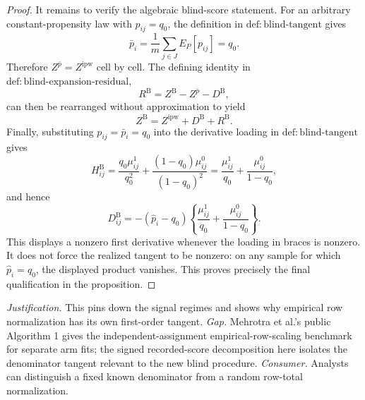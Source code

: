 \documentclass{article}
\begin{document}
\begin{proof}
It remains to verify the algebraic blind-score statement.  For an arbitrary constant-propensity law with \(p_{ij}=q_0\), the definition in \(\mathrm{def:blind\mbox{-}tangent}\) gives
\[
 \bar p_i=\frac1m\sum_{j\in J}E_P[p_{ij}]=q_0.
\]
Therefore \(Z^{\bar p}=Z^{\mathrm{ipw}}\) cell by cell.  The defining identity in \(\mathrm{def:blind\mbox{-}expansion\mbox{-}residual}\),
\[
 R^{\mathrm B}=Z^{\mathrm B}-Z^{\bar p}-D^{\mathrm B},
\]
can then be rearranged without approximation to yield
\[
 Z^{\mathrm B}=Z^{\mathrm{ipw}}+D^{\mathrm B}+R^{\mathrm B}.
\]
Finally, substituting \(p_{ij}=\bar p_i=q_0\) into the derivative loading in \(\mathrm{def:blind\mbox{-}tangent}\) gives
\[
 H^{\mathrm B}_{ij}
 =\frac{q_0\mu^1_{ij}}{q_0^2}
  +\frac{(1-q_0)\mu^0_{ij}}{(1-q_0)^2}
 =\frac{\mu^1_{ij}}{q_0}+\frac{\mu^0_{ij}}{1-q_0},
\]
and hence
\[
 D^{\mathrm B}_{ij}
 =-(\widehat p_i-q_0)
 \left\{\frac{\mu^1_{ij}}{q_0}+\frac{\mu^0_{ij}}{1-q_0}\right\}.
\]
This displays a nonzero first derivative whenever the loading in braces is nonzero.  It does not force the realized tangent to be nonzero: on any sample for which \(\widehat p_i=q_0\), the displayed product vanishes.  This proves precisely the final qualification in the proposition.
\end{proof}
\par\smallskip\noindent \textit{Justification.} This pins down the signal regimes and shows why empirical row normalization has its own first-order tangent. \textit{Gap.} Mehrotra et al.'s public Algorithm 1 gives the independent-assignment empirical-row-scaling benchmark for separate arm fits; the signed recorded-score decomposition here isolates the denominator tangent relevant to the new blind procedure. \textit{Consumer.} Analysts can distinguish a fixed known denominator from a random row-total normalization.
\end{document}
